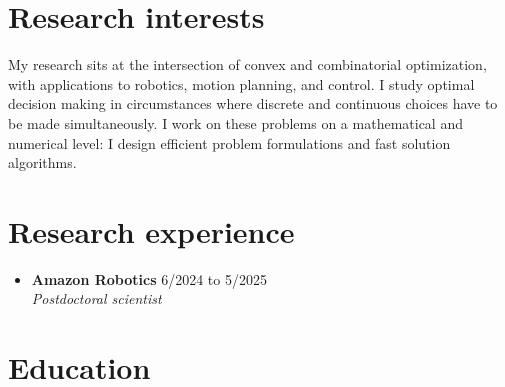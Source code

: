 \documentclass[11pt,a4paper,sans]{moderncv}
\begin{document}
\makecvtitle

\section{Research interests}

\small{
My research sits at the intersection of convex and combinatorial optimization, with applications to robotics, motion planning, and control.
I study optimal decision making in circumstances where discrete and continuous choices have to be made simultaneously.
I work on these problems on a mathematical and numerical level: I design efficient problem formulations and fast solution algorithms.
}

\section{Research experience}

\vspace{5pt}

\begin{itemize}


\item \textbf{Amazon Robotics} \hfill 6/2024 to 5/2025 \\
\textit{Postdoctoral scientist} \\

\end{itemize}

\section{Education}

\vspace{5pt}
\end{document}
